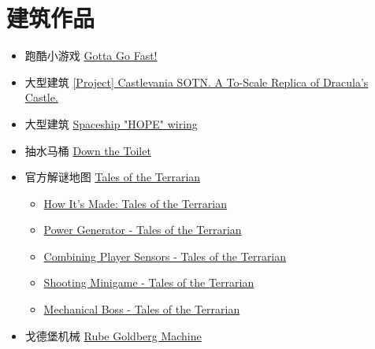 \section{建筑作品}
\begin{itemize}
\item 跑酷小游戏 \href{https://forums.terraria.org/index.php?threads/gotta-go-fast.63751/}{Gotta Go Fast!}
\item 大型建筑 \href{https://forums.terraria.org/index.php?threads/project-castlevania-sotn-a-to-scale-replica-of-draculas-castle.75802/}{[Project] Castlevania SOTN. A To-Scale Replica of Dracula's Castle.}
\item 大型建筑 \href{https://forums.terraria.org/index.php?threads/spaceship-hope-wiring.75855/}{Spaceship "HOPE" wiring}
\item 抽水马桶 \href{https://forums.terraria.org/index.php?threads/down-the-toilet.76349/}{Down the Toilet}
\item 官方解谜地图 \href{https://forums.terraria.org/index.php?threads/tales-of-the-terrarian.43625/}{Tales of the Terrarian}
	\begin{itemize}
	\item \href{https://forums.terraria.org/index.php?threads/how-its-made-tales-of-the-terrarian.76578/}{How It's Made: Tales of the Terrarian}
	\item \href{https://forums.terraria.org/index.php?threads/power-generator-tales-of-the-terrarian.76782/}{Power Generator - Tales of the Terrarian}
	\item \href{https://forums.terraria.org/index.php?threads/combining-player-sensors-tales-of-the-terrarian.76844/}{Combining Player Sensors - Tales of the Terrarian}
	\item \href{https://forums.terraria.org/index.php?threads/shooting-minigame-tales-of-the-terrarian.76842/}{Shooting Minigame - Tales of the Terrarian}
	\item \href{https://forums.terraria.org/index.php?threads/mechanical-boss-tales-of-the-terrarian.76742/}{Mechanical Boss - Tales of the Terrarian}
	\end{itemize}
\item 戈德堡机械 \href{https://forums.terraria.org/index.php?threads/rube-goldberg-machine.76620/}{Rube Goldberg Machine}
\end{itemize}

